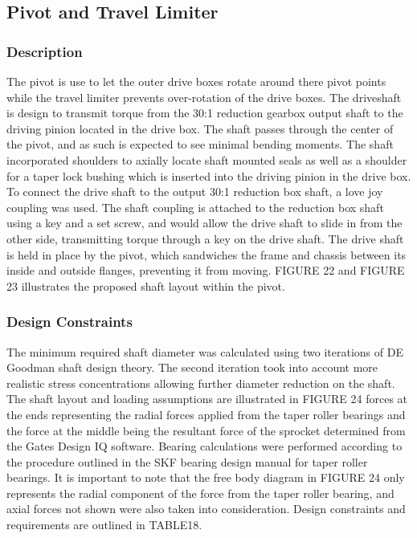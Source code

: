 \subsection{Pivot and Travel Limiter}

\subsubsection{Description}

The pivot is use to let the outer drive boxes rotate around there pivot points while the travel limiter prevents over-rotation of the drive boxes. The driveshaft is design to transmit torque from the 30:1 reduction gearbox output shaft to the driving pinion located in the drive box. The shaft passes through the center of the pivot, and as such is expected to see minimal bending moments. The shaft incorporated shoulders to axially locate shaft mounted seals as well as a shoulder for a taper lock bushing which is inserted into the driving pinion in the drive box. To connect the drive shaft to the output 30:1 reduction box shaft, a love joy coupling was used. The shaft coupling is attached to the reduction box shaft using a key and a set screw, and would allow the drive shaft to slide in from the other side, transmitting torque through a key on the drive shaft. The drive shaft is held in place by the pivot, which sandwiches the frame and chassis between its inside and outside flanges, preventing it from moving.  FIGURE 22 and FIGURE 23 illustrates the proposed shaft layout within the pivot.

\subsubsection{Design Constraints}

The minimum required shaft diameter was calculated using two iterations of DE Goodman shaft design theory. The second iteration took into account more realistic stress concentrations allowing further diameter reduction on the shaft. The shaft layout and loading assumptions are illustrated in FIGURE 24 forces at the ends representing the radial forces applied from the taper roller bearings and the force at the middle being the resultant force of the sprocket determined from the Gates Design IQ software. Bearing calculations were performed according to the procedure outlined in the SKF bearing design manual for taper roller bearings. It is important to note that the free body diagram in FIGURE 24 only represents the radial component of the force from the taper roller bearing, and axial forces not shown were also taken into consideration. Design constraints and requirements are outlined in TABLE18.  


